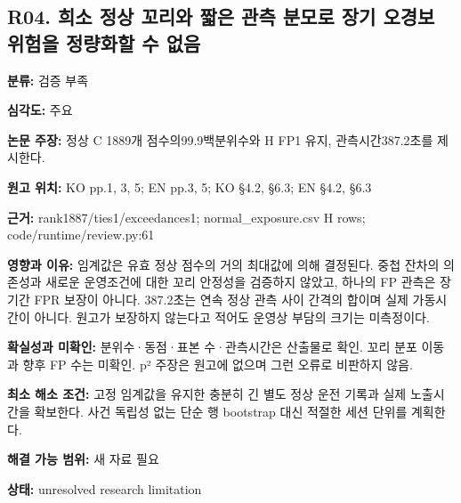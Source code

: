 \documentclass[11pt,a4paper]{article}
\begin{document}
\subsection*{R04. 희소 정상 꼬리와 짧은 관측 분모로 장기 오경보 위험을 정량화할 수 없음}
\textbf{분류:} 검증 부족
\par
\textbf{심각도:} 주요
\par
\textbf{논문 주장:} 정상 C 1889개 점수의99.9백분위수와 H FP1 유지, 관측시간387.2초를 제시한다.
\par
\textbf{원고 위치:} KO pp.1, 3, 5; EN pp.3, 5; KO §4.2, §6.3; EN §4.2, §6.3
\par
\textbf{근거:}  rank1887/ties1/exceedances1; normal\_exposure.csv H rows; code/runtime/review.py:61
\par
\textbf{영향과 이유:} 임계값은 유효 정상 점수의 거의 최대값에 의해 결정된다. 중첩 잔차의 의존성과 새로운 운영조건에 대한 꼬리 안정성을 검증하지 않았고, 하나의 FP 관측은 장기간 FPR 보장이 아니다. 387.2초는 연속 정상 관측 사이 간격의 합이며 실제 가동시간이 아니다. 원고가 보장하지 않는다고 적어도 운영상 부담의 크기는 미측정이다.
\par
\textbf{확실성과 미확인:} 분위수·동점·표본 수·관측시간은 산출물로 확인. 꼬리 분포 이동과 향후 FP 수는 미확인. p² 주장은 원고에 없으며 그런 오류로 비판하지 않음.
\par
\textbf{최소 해소 조건:} 고정 임계값을 유지한 충분히 긴 별도 정상 운전 기록과 실제 노출시간을 확보한다. 사건 독립성 없는 단순 행 bootstrap 대신 적절한 세션 단위를 계획한다.
\par
\textbf{해결 가능 범위:} 새 자료 필요
\par
\textbf{상태:} unresolved research limitation
\par
\end{document}
